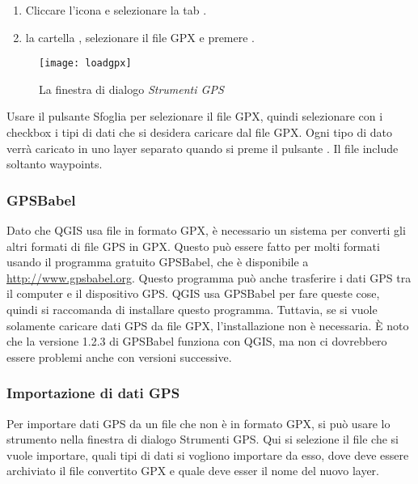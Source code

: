 \begin{enumerate}
\item Cliccare l'icona  e selezionare la tab .
\item {} la cartella ,
selezionare il file GPX  e premere .
\end{enumerate}

\begin{figure}[ht]
   \begin{center}
\caption{\label{gpxloader}La finestra di dialogo \emph{Strumenti GPS} \nixcaption}
\texttt{[image: loadgpx]}
\end{center}
\end{figure}

Usare il pulsante Sfoglia \browsebutton per selezionare il file GPX, quindi selezionare con i checkbox i tipi di dati che si desidera caricare dal file GPX.
Ogni tipo di dato verrà caricato in uno layer separato quando si preme il pulsante .
Il file  include soltanto waypoints.

\subsubsection{GPSBabel}

Dato che QGIS usa file in formato GPX, è necessario un sistema per converti gli altri formati di file GPS in GPX.
Questo può essere fatto per molti formati usando il programma gratuito GPSBabel, che è disponibile a \url{http://www.gpsbabel.org}.
Questo programma può anche trasferire i dati GPS tra il computer e il dispositivo GPS. QGIS usa GPSBabel per fare queste cose, quindi si raccomanda di installare questo programma. Tuttavia, se si vuole solamente caricare dati GPS da file GPX, l'installazione non è necessaria.
È noto che la versione 1.2.3 di GPSBabel funziona con QGIS, ma non ci dovrebbero essere problemi anche con versioni successive.


\subsubsection{Importazione di dati GPS}

Per importare dati GPS da un file che non è in formato GPX, si può usare lo strumento  nella finestra di dialogo Strumenti GPS.
Qui si selezione il file che si vuole importare, quali tipi di dati si vogliono importare da esso, dove deve essere archiviato il file convertito GPX e quale deve esser il nome del nuovo layer.

